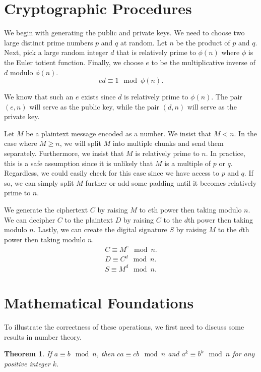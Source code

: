 \documentclass[10pt]{article}
\newtheorem{theorem}{Theorem}[section]
\begin{document}
\section{Cryptographic Procedures}
We begin with generating the public and private keys. We need to choose two large distinct prime numbers $p$ and $q$ at random. Let $n$ be the product of $p$ and $q$. Next, pick a large random integer $d$ that is relatively prime to $\phi(n)$ where $\phi$ is the Euler totient function. Finally, we choose $e$ to be the multiplicative inverse of $d$ modulo $\phi(n)$.
\begin{equation*}
	e d \equiv 1 \mod \phi(n).
\end{equation*}

We know that such an $e$ exists since $d$ is relatively prime to $\phi(n)$. The pair $(e, n)$ will serve as the public key, while the pair $(d, n)$ will serve as the private key.

Let $M$ be a plaintext message encoded as a number. We insist that $M < n$. In the case where $M \geq n$, we will split $M$ into multiple chunks and send them separately. Furthermore, we insist that $M$ is relatively prime to $n$. In practice, this is a safe assumption since it is unlikely that $M$ is a multiple of $p$ or $q$. Regardless, we could easily check for this case since we have access to $p$ and $q$. If so, we can simply split $M$ further or add some padding until it becomes relatively prime to $n$.

We generate the ciphertext $C$ by raising $M$ to $e$th power then taking modulo $n$. We can decipher $C$ to the plaintext $D$ by raising $C$ to the $d$th power then taking modulo $n$. Lastly, we can create the digital signature $S$ by raising $M$ to the $d$th power then taking modulo $n$.
\begin{align*}
    C \equiv M^e \mod n.
 \\ D \equiv C^d \mod n.
 \\ S \equiv M^d \mod n.
\end{align*}


\section{Mathematical Foundations}
To illustrate the correctness of these operations, we first need to discuss some results in number theory.

\begin{theorem}
\label{cong_thms}
    If $a \equiv b \mod n$, then $c a \equiv c b \mod n$ and $a^k \equiv b^k \mod n$ for any positive integer $k$.
\end{theorem}
\end{document}
